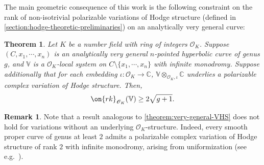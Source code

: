 \documentclass[12 pt]{amsart}
\theoremstyle{plain}
\newtheorem{theorem}[subsubsection]{Theorem}
\theoremstyle{definition}
\newtheorem{remark}[subsubsection]{Remark}
\theoremstyle{remark}
\numberwithin{equation}{section}
\begin{document}
The main geometric consequence of this work is the following constraint on the
rank of non-isotrivial polarizable variations of Hodge structure (defined in
\autoref{section:hodge-theoretic-preliminaries}) on an analytically very general curve:
\begin{theorem}\label{theorem:very-general-VHS}
	Let $K$ be a number field with ring of integers
$\mathscr{O}_K$. Suppose 
$(C, x_1, \cdots, x_n)$ 
is an analytically very general $n$-pointed
hyperbolic curve of genus $g$, and $\mathbb{V}$ is a $\mathscr{O}_K$-local system on $C\setminus\{x_1, \cdots, x_n\}$ with infinite monodromy. 
Suppose additionally that for each embedding $\iota: \mathscr{O}_K\to \mathbb{C}$, $\mathbb{V}\otimes_{\mathscr{O}_K, \iota}\mathbb{C}$ underlies a polarizable complex variation of Hodge structure. 
Then, $$\on{rk}_{\mathscr{O}_K}(\mathbb{V})\geq 2\sqrt{g+1}.$$
\end{theorem}
\begin{remark}
	\label{remark:}
	Note that a result analogous to \autoref{theorem:very-general-VHS} does
	not hold for variations without an underlying $\mathscr{O}_K$-structure. 
	Indeed, every smooth proper curve of genus at least $2$ admits a polarizable complex  variation of Hodge structure of rank $2$ with infinite monodromy, arising from uniformization (see e.g.~\cite[bottom of p.~870]{simpson:constructing-VHS}).
\end{remark}
\end{document}
